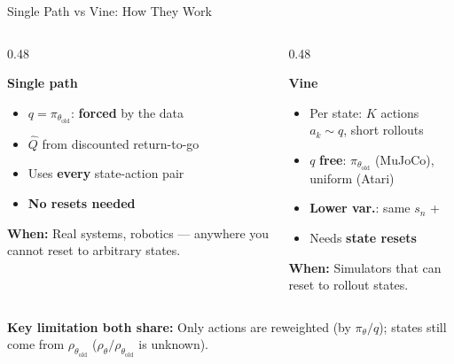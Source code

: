 \documentclass[aspectratio=169]{beamer}
\newcommand{\told}{\theta_{\mathrm{old}}}
\begin{document}
\begin{frame}[label=sp-vine]{Single Path vs Vine: How They Work}
  \begin{columns}[t]
    \begin{column}{0.48\textwidth}
      \begin{warmbox}
        \small\textbf{\color{AtlasWarm}Single path}
        \begin{itemize}\small
          \item $q = \pi_{\told}$: \textbf{forced} by the data
          \item $\hat Q$ from discounted return-to-go
          \item Uses \textbf{every} state-action pair
          \item \textbf{No resets needed}
        \end{itemize}
      \end{warmbox}
      \vspace{6pt}
      {\footnotesize\color{AtlasWarm!80!black}\textbf{When:} Real systems, robotics --- anywhere you cannot reset to arbitrary states.}
    \end{column}
    \begin{column}{0.48\textwidth}
      \begin{coolbox}
        \small\textbf{\color{AtlasCool}Vine}
        \begin{itemize}\small
          \item Per state: $K$ actions $a_k\sim q$, short rollouts
          \item $q$ \textbf{free}: $\pi_{\told}$ (MuJoCo), uniform (Atari)
          \item \textbf{Lower var.}: same $s_n$ + \hyperlink{crn}{}
          \item Needs \textbf{state resets}
        \end{itemize}
      \end{coolbox}
      \vspace{6pt}
      {\footnotesize\color{AtlasCool!80!black}\textbf{When:} Simulators that can reset to rollout states.}
    \end{column}
  \end{columns}
  \vspace{4pt}
  \begin{noteframe}
    \small\textbf{Key limitation both share:} Only actions are reweighted (by $\pi_\theta/q$); states still come from $\rho_{\told}$ ($\rho_\theta/\rho_{\told}$ is unknown).

\end{noteframe}
\end{frame}
\end{document}
